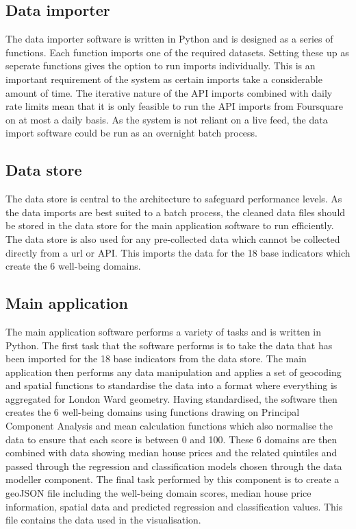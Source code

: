 
\subsection{Data importer}
The data importer software is written in Python and is designed as a series of functions. Each function imports one of the required datasets. Setting these up as seperate functions gives the option to run imports individually. This is an important requirement of the system as certain imports take a considerable amount of time. The iterative nature of the API imports combined with daily rate limits mean that it is only feasible to run the API imports from Foursquare on at most a daily basis. As the system is not reliant on a live feed, the data import software could be run as an overnight batch process. 


\subsection{Data store}
The data store is central to the architecture to safeguard performance levels. As the data imports are best suited to a batch process, the cleaned data files should be stored in the data store for the main application software to run efficiently. The data store is also used for any pre-collected data which cannot be collected directly from a url or API. This imports the data for the 18 base indicators which create the 6 well-being domains.


\subsection{Main application}
The main application software performs a variety of tasks and is written in Python. The first task that the software performs is to take the data that has been imported for the 18 base indicators from the data store. The main application then performs any data manipulation and applies a set of geocoding and spatial functions to standardise the data into a format where everything is aggregated for London Ward geometry. Having standardised, the software then creates the 6 well-being domains using functions drawing on Principal Component Analysis and mean calculation functions which also normalise the data to ensure that each score is between 0 and 100.
These 6 domains are then combined with data showing median house prices and the related quintiles and passed through the regression and classification models chosen through the data modeller component. The final task performed by this component is to create a geoJSON file including the well-being domain scores, median house price information, spatial data and predicted regression and classification values. This file contains the data used in the visualisation.

